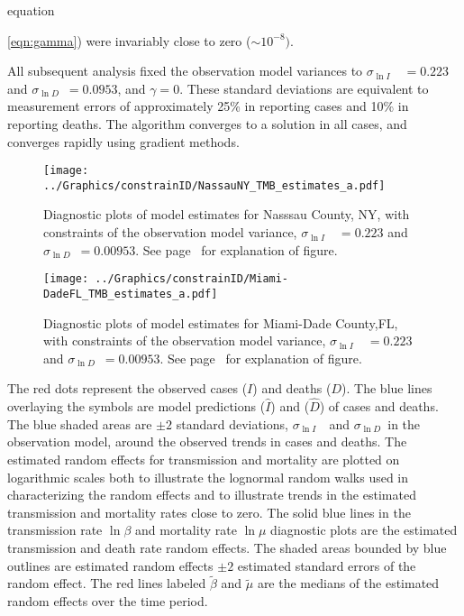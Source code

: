 \documentclass[12pt,letterpaper]{article}
\newcommand\slI{$\sigma_{\ln I}$\ }
\newcommand\slD{$\sigma_{\ln D}$}
\begin{document}
equation~{\ref{eqn:gamma}) were invariably close to 
zero ($\sim 10^{-8})$.

All subsequent analysis fixed the observation model variances to
\slI~$ = 0.223$ and \slD~$= 0.0953$, and $\gamma = 0$.
These standard deviations are equivalent to measurement errors of
approximately 25\% in reporting cases and 10\% in reporting deaths.
The algorithm converges to a solution in all cases, and converges
rapidly using gradient methods.

\begin{figure}
\begin{center}
\texttt{[image: ../Graphics/constrainID/NassauNY\_TMB\_estimates\_a.pdf]}
\end{center}
\caption{\label{fig:estsNaNYc}
Diagnostic plots of model estimates for Nasssau County, NY, 
with constraints of the observation model variance, 
\slI~$ = 0.223$ and \slD~$= 0.00953$. 
See page~\pageref{pp:diagexpl} for explanation of figure.
}
\end{figure}

\begin{figure}
\begin{center}
\texttt{[image: ../Graphics/constrainID/Miami-DadeFL\_TMB\_estimates\_a.pdf]}
\end{center}
\caption{\label{fig:estsMDFLc}
Diagnostic plots of model estimates for Miami-Dade County,FL,
with constraints of the observation model variance, 
\slI~$ = 0.223$ and \slD~$= 0.00953$. 
See page~\pageref{pp:diagexpl} for explanation of figure.
}
\end{figure}

\label{pp:diagexpl} 
The red dots represent the observed cases ($I$) and deaths ($D$).
The blue lines overlaying the symbols are model predictions ($\widehat{I}$)
and ($\widehat{D}$) of cases and deaths. 
The blue shaded areas are 
$\pm 2$ standard deviations, \slI\ and \slD\ in the
observation model, around the observed trends in cases and deaths.
The estimated random effects for transmission and mortality are plotted
on logarithmic scales both to illustrate the
lognormal random walks used in characterizing the random effects
and to illustrate trends in the estimated transmission and mortality
rates close to zero.
The solid blue lines in the transmission rate $\ln \beta$ and
mortality rate $\ln \mu$ diagnostic plots are the estimated
transmission and death rate random effects.
The shaded areas bounded by blue outlines are
estimated random effects $\pm 2$ estimated standard errors of the
random effect.
The red lines labeled $\tilde{\beta}$ and $\tilde{\mu}$ are the
medians of the estimated random effects over the time period.

}
\end{document}
